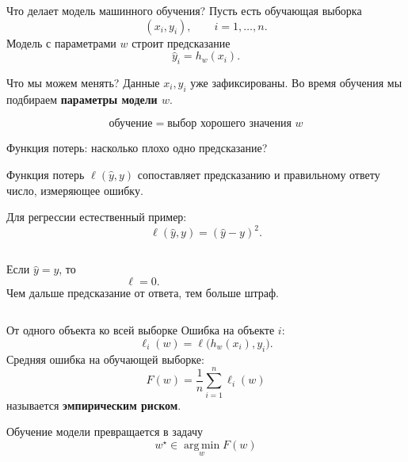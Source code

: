 \documentclass[aspectratio=169,10pt]{beamer}
\newcommand{\argmin}{\operatorname*{arg\,min}}
\newcommand{\loss}{\ell}
\begin{document}
\begin{frame}{Что делает модель машинного обучения?}
Пусть есть обучающая выборка
\[
  (x_i,y_i),\qquad i=1,\dots,n.
\]
Модель с параметрами $w$ строит предсказание
\[
  \widehat y_i=h_w(x_i).
\]

\begin{block}{Что мы можем менять?}
Данные $x_i,y_i$ уже зафиксированы. Во время обучения мы подбираем \textbf{параметры модели $w$}.
\end{block}

\[
  \boxed{\text{обучение} = \text{выбор хорошего значения }w}
\]
\end{frame}

\begin{frame}{Функция потерь: насколько плохо одно предсказание?}
\begin{definition}
Функция потерь $\loss(\widehat y,y)$ сопоставляет предсказанию и правильному ответу число, измеряющее ошибку.
\end{definition}

Для регрессии естественный пример:
\[
  \loss(\widehat y,y)=(\widehat y-y)^2.
\]

\begin{columns}[T,onlytextwidth]
Если $\widehat y=y$, то
\[
  \loss=0.
\]
Чем дальше предсказание от ответа, тем больше штраф.
\end{columns}
\end{frame}

\begin{frame}{От одного объекта ко всей выборке}
Ошибка на объекте $i$:
\[
  \loss_i(w)=\loss\bigl(h_w(x_i),y_i\bigr).
\]
Средняя ошибка на обучающей выборке:
\[
  \boxed{
  F(w)=\frac{1}{n}\sum_{i=1}^{n}\loss_i(w)
  }
\]
называется \textbf{эмпирическим риском}.

\pause
\vspace{0.6em}
Обучение модели превращается в задачу
\[
  \boxed{
  w^\star\in\argmin_w F(w)
  }
\]
\end{frame}
\end{document}
